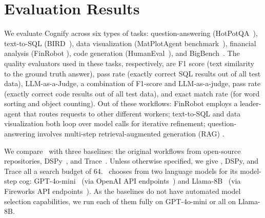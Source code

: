 %
%
% 
% 
\section{Evaluation Results}
\label{sec:results}

We evaluate Cognify across six types of tasks: question-answering (HotPotQA~\cite{yang2018hotpotqa}), text-to-SQL (BIRD~\cite{gao2023texttosql}), data visualization (MatPlotAgent benchmark~\cite{datavis}), financial analysis (FinRobot \cite{finrobot}), code generation (HumanEval~\cite{humaneval}), and BigBench~\cite{bigbench}. The quality evaluators used in these tasks, respectively, are F1 score (text similarity to the ground truth answer), pass rate (exactly correct SQL results out of all test data), LLM-as-a-Judge, a combination of F1-score and LLM-as-a-judge, pass rate (exactly correct code results out of all test data), and exact match rate (for word sorting and object counting). Out of these workflows: FinRobot employs a leader-agent that routes requests to other different workers; text-to-SQL and data visualization both loop over model calls for iterative refinement; question-answering involves multi-step retrieval-augmented generation (RAG) \cite{lewis20rag}. 



We compare \sysname\ with three baselines: the original workflows from open-source repositories, DSPy~\cite{DSPy-repo}, and Trace~\cite{Trace}. 
Unless otherwise specified, we give \sysname, DSPy, and Trace all a search budget of 64. \sysname\ chooses from two language models for its model-step cog: GPT-4o-mini~\cite{4o-mini} (via OpenAI API endpoints~\cite{openaiapi}) and Llama-8B~\cite{llama3.1} (via Fireworks API endpoints~\cite{fireworksai2024api}). As the baselines do not have automated model selection capabilities, we run each of them fully on GPT-4o-mini or all on Llama-8B.

